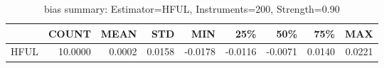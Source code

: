 \begin{table}[ht]
\centering
\caption{bias summary: Estimator=HFUL, Instruments=200, Strength=0.90}
\begin{tabular}{lrrrrrrrr}
\toprule
 & COUNT & MEAN & STD & MIN & 25\% & 50\% & 75\% & MAX \\
\midrule
HFUL & 10.0000 & 0.0002 & 0.0158 & -0.0178 & -0.0116 & -0.0071 & 0.0140 & 0.0221 \\
\bottomrule
\end{tabular}
\end{table}
